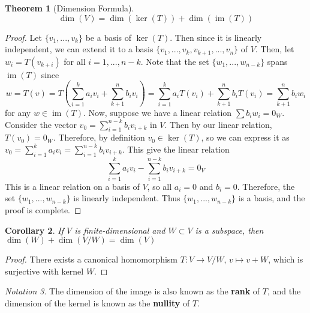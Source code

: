 \documentclass[12pt]{article}
\newtheorem{thm}{Theorem}[section]
\newtheorem{cor}[thm]{Corollary}
\theoremstyle{definition}
\theoremstyle{remark}
\newtheorem{nota}[thm]{Notation}
\numberwithin{equation}{section}
\newcommand\B[1]{\textbf{ #1}}
\DeclareMathOperator{\im}{im}
\begin{document}
\begin{thm}[Dimension Formula]
        \begin{equation}
                \dim(V) = \dim(\ker(T)) + \dim(\im(T))
        \end{equation}
\end{thm}
\begin{proof}
        Let $\{v_1,...,v_k\}$ be a basis of $\ker(T)$. Then since it is linearly independent, we can extend it to a basis $\{v_1,...,v_k,v_{k+1},...,v_n\}$ of $V$. Then, let $w_i = T(v_{k+i})$ for all $i = 1,...,n-k$. Note that the set $\{w_1,...,w_{n-k}\}$ spans $\im(T)$ since \begin{equation}
                w = T(v) = T\left(\sum\limits_{i=1}^ka_iv_i+\sum\limits_{k+1}^nb_iv_i\right) = \sum\limits_{i=1}^ka_iT(v_i)+\sum\limits_{k+1}^nb_iT(v_i) = \sum\limits_{k+1}^nb_iw_i
        \end{equation}
        for any $w \in \im(T)$. Now, suppose we have a linear relation $\sum b_iw_i = 0_W$. Consider the vector $v_0 = \sum_{i=1}^{n-k} b_i v_{i+k}$ in $V$. Then by our linear relation, $T(v_0) = 0_W$. Therefore, by definition $v_0 \in \ker(T)$, so we can express it as $v_0 = \sum_{i=1}^{k}a_iv_i = \sum_{i=1}^{n-k}b_iv_{i+k}$. This give the linear relation \begin{equation}
                \sum_{i=1}^{k}a_iv_i - \sum_{i=1}^{n-k}b_iv_{i+k} = 0_V
        \end{equation}
        This is a linear relation on a basis of $V$, so all $a_i = 0$ and $b_i = 0$. Therefore, the set $\{w_1,...,w_{n-k}\}$ is linearly independent. Thus $\{w_1,...,w_{n-k}\}$ is a basis, and the proof is complete.
\end{proof}

\vspace{15pt}

\begin{cor}
        If $V$ is finite-dimensional and $W \subset V$ is a subspace, then $\dim(W) + \dim(V/W) = \dim(V)$
\end{cor}
\begin{proof}
        There exists a canonical homomorphism $T: V\rightarrow V/W$, $v \mapsto v+W$, which is surjective with kernel $W$.
\end{proof}

\vspace{15pt}

\begin{nota}
        The dimension of the image is also known as the \B{rank} of $T$, and the dimension of the kernel is known as the \B{nullity} of $T$.
\end{nota}
\end{document}
